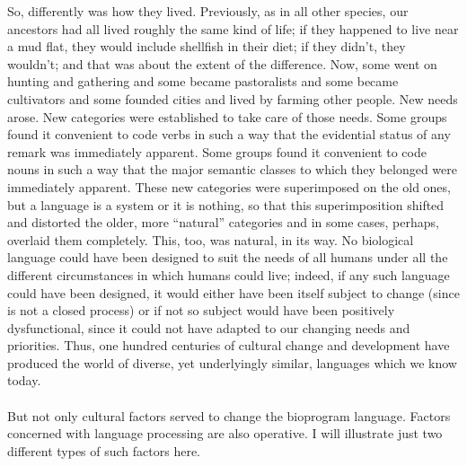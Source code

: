 So, differently was how they lived. Previously, as in all other species, our ancestors had all lived roughly the same kind of life; if they happened to live near a mud flat, they would include shellfish in their diet; if they didn't, they wouldn't; and that was about the extent of the difference. Now, some went on hunting and gathering and some became pastoralists and some became cultivators and some founded cities and lived by farming other people. New needs arose. New categories were established to take care of those needs. Some groups found it convenient to code verbs in such a way that the evidential status of any remark was immediately apparent. Some groups found it convenient to code nouns in such a way that the major semantic classes
to which they belonged were immediately apparent. These new categories were superimposed on the old ones, but a language is a system or it is nothing, so that this superimposition shifted and distorted the older, more ``natural'' categories and in some cases, perhaps, overlaid them completely. This, too, was natural, in its way. No biological language could have been designed to suit the needs of all humans under all the different circumstances in which humans could live; indeed, if any such language could have been designed, it would either have been itself subject to change (since  is not a closed process) or if not so subject would have been positively dysfunctional, since it could not have adapted to our changing needs and priorities. Thus, one hundred centuries of cultural change and development have produced the world of diverse, yet underlyingly similar, languages which we know today.\\\\

But not only cultural factors served to change the bioprogram language. Factors concerned with language processing are also operative. I will illustrate just two different types of such factors here.


